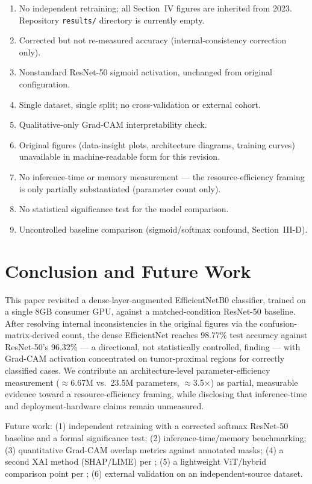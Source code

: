 \documentclass[journal]{IEEEtran}
\begin{document}
\begin{enumerate}
\item No independent retraining; all Section~IV figures are inherited from 2023. Repository \texttt{results/} directory is currently empty.
\item Corrected but not re-measured accuracy (internal-consistency correction only).
\item Nonstandard ResNet-50 sigmoid activation, unchanged from original configuration.
\item Single dataset, single split; no cross-validation or external cohort.
\item Qualitative-only Grad-CAM interpretability check.
\item Original figures (data-insight plots, architecture diagrams, training curves) unavailable in machine-readable form for this revision.
\item No inference-time or memory measurement --- the resource-efficiency framing is only partially substantiated (parameter count only).
\item No statistical significance test for the model comparison.
\item Uncontrolled baseline comparison (sigmoid/softmax confound, Section~III-D).
\end{enumerate}

\section{Conclusion and Future Work}

This paper revisited a dense-layer-augmented EfficientNetB0 classifier, trained on a single 8GB consumer GPU, against a matched-condition ResNet-50 baseline. After resolving internal inconsistencies in the original figures via the confusion-matrix-derived count, the dense EfficientNet reaches 98.77\% test accuracy against ResNet-50's 96.32\% --- a directional, not statistically controlled, finding --- with Grad-CAM activation concentrated on tumor-proximal regions for correctly classified cases. We contribute an architecture-level parameter-efficiency measurement ($\approx$6.67M vs.\ 23.5M parameters, $\approx$3.5$\times$) as partial, measurable evidence toward a resource-efficiency framing, while disclosing that inference-time and deployment-hardware claims remain unmeasured.

Future work: (1) independent retraining with a corrected softmax ResNet-50 baseline and a formal significance test; (2) inference-time/memory benchmarking; (3) quantitative Grad-CAM overlap metrics against annotated masks; (4) a second XAI method (SHAP/LIME) per \cite{ref13,ref14}; (5) a lightweight ViT/hybrid comparison point per \cite{ref15}; (6) external validation on an independent-source dataset.
\end{document}
